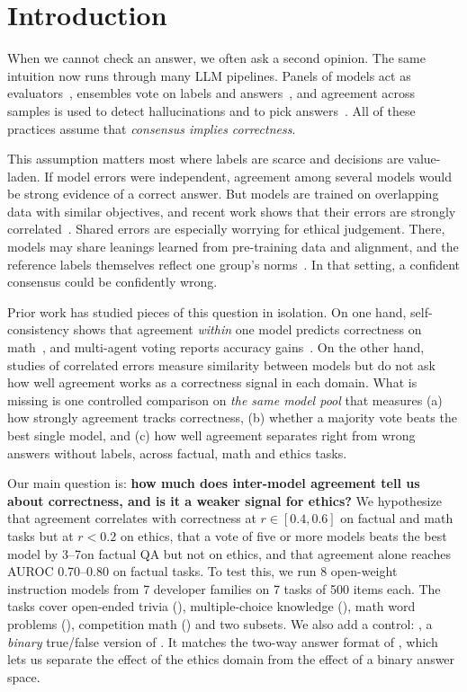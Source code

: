 \section{Introduction}
\label{sec:intro}

When we cannot check an answer, we often ask a second opinion.
The same intuition now runs through many LLM pipelines.
Panels of models act as evaluators~\citep{verga2024juries}, ensembles vote on labels and answers~\citep{li2024moreagents,jiang2023llmblender}, and agreement across samples is used to detect hallucinations and to pick answers~\citep{wang2023selfconsistency}.
All of these practices assume that {\em consensus implies correctness}.

This assumption matters most where labels are scarce and decisions are value-laden.
If model errors were independent, agreement among several models would be strong evidence of a correct answer.
But models are trained on overlapping data with similar objectives, and recent work shows that their errors are strongly correlated~\citep{goel2025greatmodels,kim2025correlated}.
Shared errors are especially worrying for ethical judgement.
There, models may share leanings learned from pre-training data and alignment, and the reference labels themselves reflect one group's norms~\citep{hendrycks2021ethics}.
In that setting, a confident consensus could be confidently wrong.

Prior work has studied pieces of this question in isolation.
On one hand, self-consistency shows that agreement {\em within} one model predicts correctness on math~\citep{wang2023selfconsistency}, and multi-agent voting reports accuracy gains~\citep{li2024moreagents}.
On the other hand, studies of correlated errors measure similarity between models but do not ask how well agreement works as a correctness signal in each domain.
What is missing is one controlled comparison on {\em the same model pool} that measures (a) how strongly agreement tracks correctness, (b) whether a majority vote beats the best single model, and (c) how well agreement separates right from wrong answers without labels, across factual, math and ethics tasks.

Our main question is: {\bf how much does inter-model agreement tell us about correctness, and is it a weaker signal for ethics?}
We hypothesize that agreement correlates with correctness at $r \in [0.4, 0.6]$ on factual and math tasks but at $r < 0.2$ on ethics, that a vote of five or more models beats the best model by 3--7\pp on factual QA but not on ethics, and that agreement alone reaches AUROC 0.70--0.80 on factual tasks.
To test this, we run 8 open-weight instruction models from 7 developer families on 7 tasks of 500 items each.
The tasks cover open-ended trivia (\triviaqa), multiple-choice knowledge (\mmlu), math word problems (\gsm), competition math (\mathfive) and two \ethics subsets.
We also add a control: \mmlutf, a {\em binary} true/false version of \mmlu.
It matches the two-way answer format of \ethics, which lets us separate the effect of the ethics domain from the effect of a binary answer space.

